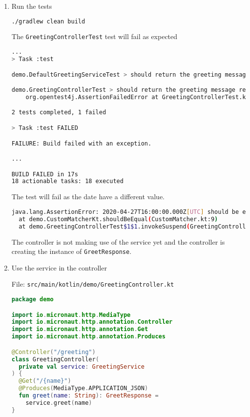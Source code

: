 \begin{enumerate}
\item Run the tests

\begin{lstlisting}[language=bash]
./gradlew clean build
\end{lstlisting}

The \texttt{GreetingControllerTest} test will fail as expected

\begin{lstlisting}[language=bash]
...
> Task :test

demo.DefaultGreetingServiceTest > should return the greeting message for the given name PASSED

demo.GreetingControllerTest > should return the greeting message returned by the greeting service FAILED
    org.opentest4j.AssertionFailedError at GreetingControllerTest.kt:34

2 tests completed, 1 failed

> Task :test FAILED

FAILURE: Build failed with an exception.

...

BUILD FAILED in 17s
18 actionable tasks: 18 executed
\end{lstlisting}

The test will fail as the date have a different value.

\begin{lstlisting}[language=bash]
java.lang.AssertionError: 2020-04-27T16:00:00.000Z[UTC] should be equal to 2020-04-27T16:00:00.400+02:00[Europe/Berlin]
  at demo.CustomMatcherKt.shouldBeEqual(CustomMatcher.kt:9)
  at demo.GreetingControllerTest$1$1.invokeSuspend(GreetingControllerTest.kt:33)
\end{lstlisting}

The controller is not making use of the service yet and the controller is creating the instance of \texttt{GreetResponse}.

\item Use the service in the controller

File: \texttt{src/main/kotlin/demo/GreetingController.kt}
\begin{lstlisting}[language=Kotlin]
package demo

import io.micronaut.http.MediaType
import io.micronaut.http.annotation.Controller
import io.micronaut.http.annotation.Get
import io.micronaut.http.annotation.Produces

@Controller("/greeting")
class GreetingController(
  private val service: GreetingService
) {
  @Get("/{name}")
  @Produces(MediaType.APPLICATION_JSON)
  fun greet(name: String): GreetResponse =
    service.greet(name)
}
\end{lstlisting}


\end{enumerate}
